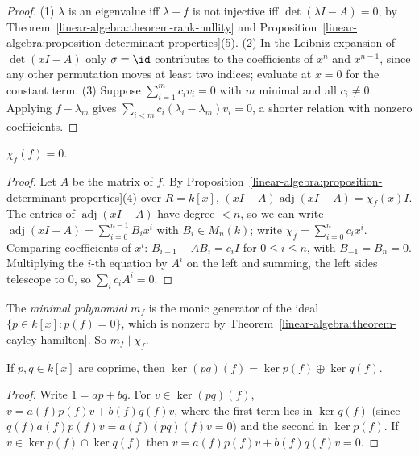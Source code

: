 \begin{proof}
(1) $\lambda$ is an eigenvalue iff $\lambda - f$ is not injective iff $\det(\lambda I - A) = 0$, by
Theorem~\ref{linear-algebra:theorem-rank-nullity} and
Proposition~\ref{linear-algebra:proposition-determinant-properties}(5).
(2) In the Leibniz expansion of $\det(xI - A)$ only $\sigma = \id$ contributes to the coefficients of $x^n$ and
$x^{n-1}$, since any other permutation moves at least two indices; evaluate at $x = 0$ for the constant
term.
(3) Suppose $\sum_{i=1}^m c_i v_i = 0$ with $m$ minimal and all $c_i \neq 0$. Applying $f - \lambda_m$ gives
$\sum_{i<m} c_i(\lambda_i - \lambda_m)v_i = 0$, a shorter relation with nonzero coefficients.
\end{proof}

\begin{theorem}\label{linear-algebra:theorem-cayley-hamilton}
$\chi_f(f) = 0$.
\end{theorem}

\begin{proof}
Let $A$ be the matrix of $f$. By Proposition~\ref{linear-algebra:proposition-determinant-properties}(4)
over $R = k[x]$, $(xI - A)\operatorname{adj}(xI - A) = \chi_f(x)I$. The entries of $\operatorname{adj}(xI - A)$ have degree
$< n$, so we can write $\operatorname{adj}(xI - A) = \sum_{i=0}^{n-1} B_i x^i$ with $B_i \in M_n(k)$; write
$\chi_f = \sum_{i=0}^n c_i x^i$. Comparing coefficients of $x^i$: $B_{i-1} - AB_i = c_i I$ for $0 \leq i \leq n$, with
$B_{-1} = B_n = 0$. Multiplying the $i$-th equation by $A^i$ on the left and summing, the left sides
telescope to $0$, so $\sum_i c_i A^i = 0$.
\end{proof}

\begin{definition}\label{linear-algebra:definition-minimal-polynomial}
The \emph{minimal polynomial} $m_f$ is the monic generator of the ideal
$\{p \in k[x] : p(f) = 0\}$, which is nonzero by Theorem~\ref{linear-algebra:theorem-cayley-hamilton}.
So $m_f \mid \chi_f$.
\end{definition}

\begin{lemma}\label{linear-algebra:lemma-kernel}
If $p, q \in k[x]$ are coprime, then $\ker (pq)(f) = \ker p(f) \oplus \ker q(f)$.
\end{lemma}

\begin{proof}
Write $1 = ap + bq$. For $v \in \ker(pq)(f)$, $v = a(f)p(f)v + b(f)q(f)v$, where the first term lies in
$\ker q(f)$ (since $q(f)a(f)p(f)v = a(f)(pq)(f)v = 0$) and the second in $\ker p(f)$. If
$v \in \ker p(f) \cap \ker q(f)$ then $v = a(f)p(f)v + b(f)q(f)v = 0$.
\end{proof}

